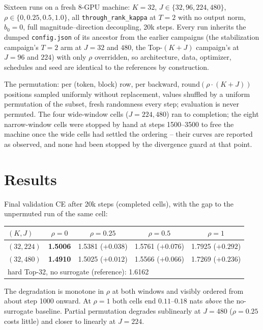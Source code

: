 \documentclass[11pt,a4paper]{article}
\newcommand{\code}[1]{\texttt{#1}}
\newcommand{\bst}[1]{\textbf{#1}}
\begin{document}
Sixteen runs on a fresh 8-GPU machine: $K = 32$,
$J \in \{32, 96, 224, 480\}$, $\rho \in \{0, 0.25, 0.5, 1.0\}$, all
\code{through\_rank\_kappa} at $T = 2$ with no output norm, $b_0 = 0$, full
magnitude--direction decoupling, 20k steps. Every run inherits the dumped
\code{config.json} of its ancestor from the earlier campaigns (the
stabilization campaign's $T=2$ arm at $J = 32$ and $480$, the
Top-$(K{+}J)$ campaign's at $J = 96$ and $224$) with only $\rho$ overridden,
so architecture, data, optimizer, schedules and seed are identical to the
references by construction.

The permutation: per (token, block) row, per backward,
$\mathrm{round}(\rho \cdot (K{+}J))$ positions sampled uniformly without
replacement, values shuffled by a uniform permutation of the subset, fresh
randomness every step; evaluation is never permuted. The four wide-window
cells ($J = 224, 480$) ran to completion; the eight narrow-window cells were
stopped by hand at steps 1500--3500 to free the machine once the wide cells
had settled the ordering -- their curves are reported as observed, and none
had been stopped by the divergence guard at that point.

\section{Results}

Final validation CE after 20k steps (completed cells), with the gap to the
unpermuted run of the same cell:

\begin{center}\small
\begin{tabular}{lcccc}
\toprule
$(K,J)$ & $\rho=0$ & $\rho=0.25$ & $\rho=0.5$ & $\rho=1$ \\
\midrule
$(32,224)$ & \bst{1.5006} & 1.5381 ($+0.038$) & 1.5761 ($+0.076$) & 1.7925 ($+0.292$) \\
$(32,480)$ & \bst{1.4910} & 1.5025 ($+0.012$) & 1.5566 ($+0.066$) & 1.7269 ($+0.236$) \\
\midrule
\multicolumn{5}{l}{hard Top-32, no surrogate (reference): 1.6162} \\
\bottomrule
\end{tabular}
\end{center}

The degradation is monotone in $\rho$ at both windows and visibly ordered
from about step 1000 onward. At $\rho = 1$ both cells end $0.11$--$0.18$
nats \emph{above} the no-surrogate baseline. Partial permutation degrades
sublinearly at $J = 480$ ($\rho = 0.25$ costs little) and closer to linearly
at $J = 224$.
\end{document}
